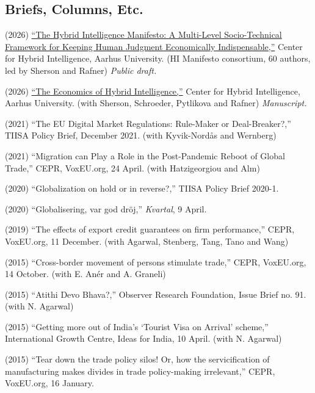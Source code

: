 \documentclass[11pt,a4paper]{article}
\newcommand{\publication}[1]{\item #1}
\begin{document}
\subsection{Briefs, Columns, Etc.}

\begin{enumerate}[label={[\arabic*]}]

\publication{(2026) \href{https://hi-infinity.ai/research/the-hybrid-intelligence-manifesto/}{``The Hybrid Intelligence Manifesto: A Multi-Level Socio-Technical Framework for Keeping Human Judgment Economically Indispensable,''} Center for Hybrid Intelligence, Aarhus University. (HI Manifesto consortium, 60 authors, led by Sherson and Rafner) \textit{Public draft.}} %

\publication{(2026) \href{https://hi-infinity.ai/research/the-economics-of-hybrid-intelligence/}{``The Economics of Hybrid Intelligence,''} Center for Hybrid Intelligence, Aarhus University. (with Sherson, Schroeder, Pytlikova and Rafner) \textit{Manuscript.}} %

\publication{(2021) ``The EU Digital Market Regulations: Rule-Maker or Deal-Breaker?,'' TIISA Policy Brief, December 2021. (with Kyvik-Nordås and Wernberg)}

\publication{(2021) ``Migration can Play a Role in the Post-Pandemic Reboot of Global Trade,'' CEPR, VoxEU.org, 24 April. (with Hatzigeorgiou and Alm)}

\publication{(2020) ``Globalization on hold or in reverse?,'' TIISA Policy Brief 2020-1.}

\publication{(2020) ``Globalisering, var god dröj,'' \textit{Kvartal}, 9 April.}

\publication{(2019) ``The effects of export credit guarantees on firm performance,'' CEPR, VoxEU.org, 11 December. (with Agarwal, Stenberg, Tang, Tano and Wang)}

\publication{(2015) ``Cross-border movement of persons stimulate trade,'' CEPR, VoxEU.org, 14 October. (with E. Anér and A. Graneli)}

\publication{(2015) ``Atithi Devo Bhava?,'' Observer Research Foundation, Issue Brief no. 91. (with N. Agarwal)}

\publication{(2015) ``Getting more out of India's `Tourist Visa on Arrival' scheme,'' International Growth Centre, Ideas for India, 10 April. (with N. Agarwal)}

\publication{(2015) ``Tear down the trade policy silos! Or, how the servicification of manufacturing makes divides in trade policy-making irrelevant,'' CEPR, VoxEU.org, 16 January.}

\end{enumerate}
\end{document}
